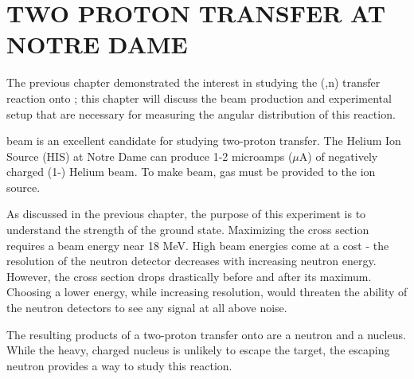 %
%
%
%
%
%
%
%

%
%

\chapter{TWO PROTON TRANSFER AT NOTRE DAME}
\label{chap:2pExpt}

The previous chapter demonstrated the interest in studying the (,n) transfer reaction onto \GeTargets ; this chapter will discuss the beam production and experimental setup that are necessary for measuring the angular distribution of this reaction.

 beam is an excellent candidate for studying two-proton transfer.  The Helium Ion Source (HIS) at Notre Dame can produce 1-2 microamps ($\mu$A) of negatively charged (1-) Helium beam.  To make  beam,  gas must be provided to the ion source.  

As discussed in the previous chapter, the purpose of this experiment is to understand the strength of the \zp ground state.  Maximizing the \zp cross section requires a beam energy near 18 MeV.  High beam energies come at a cost - the resolution of the neutron detector decreases with increasing neutron energy.  However, the \zp cross section drops drastically before and after its maximum.  Choosing a lower energy, while increasing resolution, would threaten the ability of the neutron detectors to see any signal at all above noise.

The resulting products of a two-proton transfer onto  are a neutron and a  nucleus.  While the heavy, charged  nucleus is unlikely to escape the target, the escaping neutron provides a way to study this reaction.


